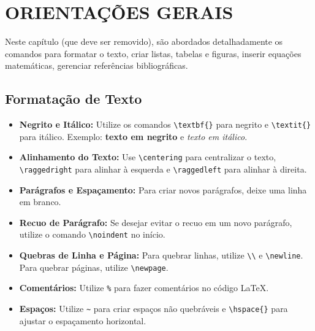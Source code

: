 \chapter{ORIENTAÇÕES GERAIS}
\label{chap:orientacoesGerais}

Neste capítulo (que deve ser removido), são abordados detalhadamente os comandos para formatar o texto, criar listas, tabelas e figuras, inserir equações matemáticas, gerenciar referências bibliográficas.

\section{Formatação de Texto}
\label{sec:formatacaoTexto}

\begin{itemize}
\item \textbf{Negrito e Itálico:} Utilize os comandos \verb|\textbf{}| para negrito e \verb|\textit{}| para itálico. Exemplo: \textbf{texto em negrito} e \textit{texto em itálico}.

\item \textbf{Alinhamento do Texto:} Use \verb|\centering| para centralizar o texto, \verb|\raggedright| para alinhar à esquerda e \verb|\raggedleft| para alinhar à direita.

\item \textbf{Parágrafos e Espaçamento:} Para criar novos parágrafos, deixe uma linha em branco.

\item \textbf{Recuo de Parágrafo:} Se desejar evitar o recuo em um novo parágrafo, utilize o comando \verb|\noindent| no início.

\item \textbf{Quebras de Linha e Página:} Para quebrar linhas, utilize \verb|\\| e \verb|\newline|. Para quebrar páginas, utilize \verb|\newpage|.

\item \textbf{Comentários:} Utilize \verb|%| para fazer comentários no código LaTeX.

\item \textbf{Espaços:} Utilize \verb|~| para criar espaços não quebráveis e \verb|\hspace{}| para ajustar o espaçamento horizontal.

\end{itemize}



